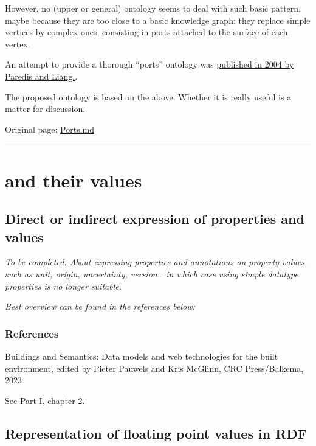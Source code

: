 \documentclass[
  11pt,
]{article}
\begin{document}
However, no (upper or general) ontology seems to deal with such basic
pattern, maybe because they are too close to a basic knowledge graph:
they replace simple vertices by complex ones, consisting in ports
attached to the surface of each vertex.

An attempt to provide a thorough ``ports'' ontology was
\href{https://www.researchgate.net/publication/250022694_A_Port_Ontology_for_Conceptual_Design_of_Systems\#fullTextFileContent}{published
in 2004 by Paredis and Liang.}.

The proposed ontology is based on the above. Whether it is really useful
is a matter for discussion.

Original page:
\href{https://github.com/UICrail/CDM-RSM/wiki/Ports}{Ports.md}

\begin{center}\rule{0.5\linewidth}{0.5pt}\end{center}

\hypertarget{and-their-values}{%
\section{and their values}\label{and-their-values}}

\hypertarget{direct-or-indirect-expression-of-properties-and-values}{%
\subsection{Direct or indirect expression of properties and
values}\label{direct-or-indirect-expression-of-properties-and-values}}

\emph{To be completed. About expressing properties and annotations on
property values, such as unit, origin, uncertainty, version\ldots{} in
which case using simple datatype properties is no longer suitable.}

\emph{Best overview can be found in the references below:}

\hypertarget{references-1}{%
\subsubsection{References}\label{references-1}}

Buildings and Semantics: Data models and web technologies for the built
environment, edited by Pieter Pauwels and Kris McGlinn, CRC
Press/Balkema, 2023

See Part I, chapter 2.

\hypertarget{representation-of-floating-point-values-in-rdf}{%
\subsection{Representation of floating point values in
RDF}\label{representation-of-floating-point-values-in-rdf}}
\end{document}
